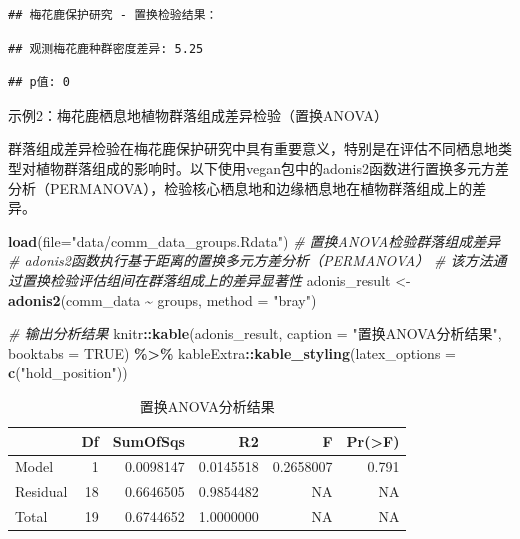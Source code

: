 \documentclass[
  twoside,12pt,fontset=none]{ctexbook}
\newenvironment{Shaded}{\begin{snugshade}}{\end{snugshade}}
\newcommand{\AttributeTok}[1]{\textcolor[rgb]{0.13,0.29,0.53}{#1}}
\newcommand{\CommentTok}[1]{\textcolor[rgb]{0.56,0.35,0.01}{\textit{#1}}}
\newcommand{\ConstantTok}[1]{\textcolor[rgb]{0.56,0.35,0.01}{#1}}
\newcommand{\FunctionTok}[1]{\textcolor[rgb]{0.13,0.29,0.53}{\textbf{#1}}}
\newcommand{\NormalTok}[1]{#1}
\newcommand{\OtherTok}[1]{\textcolor[rgb]{0.56,0.35,0.01}{#1}}
\newcommand{\SpecialCharTok}[1]{\textcolor[rgb]{0.81,0.36,0.00}{\textbf{#1}}}
\newcommand{\StringTok}[1]{\textcolor[rgb]{0.31,0.60,0.02}{#1}}
\begin{document}
\begin{verbatim}
## 梅花鹿保护研究 - 置换检验结果：
\end{verbatim}

\begin{verbatim}
## 观测梅花鹿种群密度差异: 5.25
\end{verbatim}

\begin{verbatim}
## p值: 0
\end{verbatim}

示例2：梅花鹿栖息地植物群落组成差异检验（置换ANOVA）

群落组成差异检验在梅花鹿保护研究中具有重要意义，特别是在评估不同栖息地类型对植物群落组成的影响时。以下使用vegan包中的adonis2函数进行置换多元方差分析（PERMANOVA），检验核心栖息地和边缘栖息地在植物群落组成上的差异。

\begin{Shaded}
\begin{Highlighting}[]
\FunctionTok{load}\NormalTok{(}\AttributeTok{file=}\StringTok{"data/comm\_data\_groups.Rdata"}\NormalTok{)}
\CommentTok{\# 置换ANOVA检验群落组成差异}
\CommentTok{\# adonis2函数执行基于距离的置换多元方差分析（PERMANOVA）}
\CommentTok{\# 该方法通过置换检验评估组间在群落组成上的差异显著性}
\NormalTok{adonis\_result }\OtherTok{\textless{}{-}} \FunctionTok{adonis2}\NormalTok{(comm\_data }\SpecialCharTok{\textasciitilde{}}\NormalTok{ groups, }\AttributeTok{method =} \StringTok{"bray"}\NormalTok{)}

\CommentTok{\# 输出分析结果}
\NormalTok{knitr}\SpecialCharTok{::}\FunctionTok{kable}\NormalTok{(adonis\_result, }\AttributeTok{caption =} \StringTok{"置换ANOVA分析结果"}\NormalTok{, }\AttributeTok{booktabs =} \ConstantTok{TRUE}\NormalTok{) }\SpecialCharTok{\%\textgreater{}\%}
\NormalTok{  kableExtra}\SpecialCharTok{::}\FunctionTok{kable\_styling}\NormalTok{(}\AttributeTok{latex\_options =} \FunctionTok{c}\NormalTok{(}\StringTok{"hold\_position"}\NormalTok{))}
\end{Highlighting}
\end{Shaded}

\begin{table}[!h]
\centering
\caption{\label{tab:adonis-result-table}置换ANOVA分析结果}
\centering
\begin{tabular}[t]{lrrrrr}
\toprule
  & Df & SumOfSqs & R2 & F & Pr(>F)\\
\midrule
Model & 1 & 0.0098147 & 0.0145518 & 0.2658007 & 0.791\\
Residual & 18 & 0.6646505 & 0.9854482 & NA & NA\\
Total & 19 & 0.6744652 & 1.0000000 & NA & NA\\
\bottomrule
\end{tabular}
\end{table}
\end{document}
